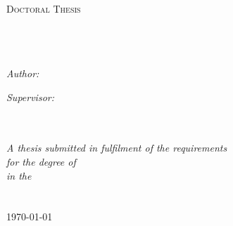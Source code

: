 \documentclass[11pt, oneside]{Thesis} %
\begin{document}
\begin{titlepage}
\begin{center}

\textsc{\LARGE \univname}\\[1.5cm] %
\textsc{\Large Doctoral Thesis}\\[1.5cm] %

\HRule \\[0.4cm] %
{\huge \bfseries \ttitle}\\[0.4cm] %
\HRule \\[1.5cm] %
 
\begin{minipage}{0.4\textwidth}
\begin{flushleft} \large
\emph{Author:}\\
\href{http://cbio.ensmp.fr/~nvaroquaux}{\authornames} %
\end{flushleft}
\end{minipage}
\begin{minipage}{0.4\textwidth}
\begin{flushright} \large
\emph{Supervisor:} \\
\href{http://cbio.ensmp.fr/~jvert}{\supnameOne} \\ %
\end{flushright}
\end{minipage}\\[3cm]
 
\large \textit{A thesis submitted in fulfilment of the requirements\\ for the degree of \degreename}\\[0.3cm] %
\textit{in the}\\[0.4cm]
\groupname\\\deptname\\[2cm] %
 
{\large \today}\\[4cm] %
 
\vfill
\end{center}

\afterpage{\blankpage} %

\end{titlepage}
\end{document}
